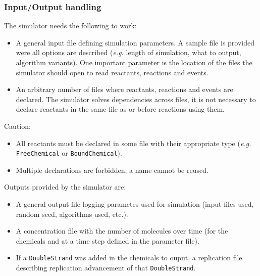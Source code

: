 
\subsubsection{Input/Output handling}


The simulator needs the following to work:
\begin{itemize}
  \item A general input file defining simulation parameters. A sample file is provided were all options are described (\textit{e.g.} length of simulation, what to output, algorithm variants). One important parameter is the location of the files the simulator should open to read reactants, reactions and events.
  \item An arbitrary number of files where reactants, reactions and events are declared. The simulator solves dependencies across files, it is not necessary to declare reactants in the same file as or before reactions using them.
\end{itemize}

Caution:
\begin{itemize}
\item All reactants must be declared in some file with their appropriate type (\textit{e.g.} \texttt{FreeChemical} or \texttt{BoundChemical}).
\item Multiple declarations are forbidden, a name cannot be reused.
\end{itemize}


Outputs provided by the simulator are:
\begin{itemize}
\item A general output file logging parametes used for simulation (input files used, random seed, algorithms used, etc.).
\item A concentration file with the number of molecules over time (for the chemicals and at a time step defined in the parameter file).
\item If a \texttt{DoubleStrand} was added in the chemicals to ouput, a replication file describing replication advancement of that \texttt{DoubleStrand}.
\end{itemize}
